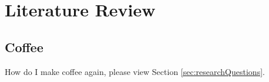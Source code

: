 
\chapter{Literature Review}
\label{chap:lit}

\section{Coffee}

How do I make coffee again, please view Section \ref{sec:researchQuestions}.